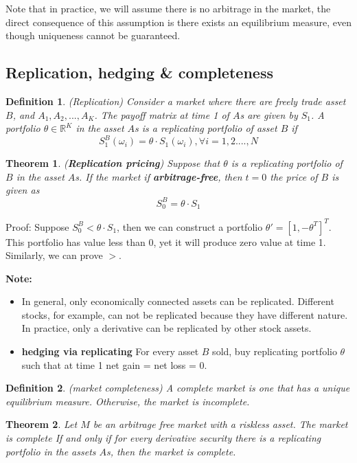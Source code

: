 \documentclass[a4paper,13pt]{report}
\newcommand{\R}{\mathbb{R}}
\newtheorem{theorem}{Theorem}[section]
\newtheorem*{definition}{Definition}
\begin{document}
Note that in practice, we will assume there is no arbitrage in the market, the direct consequence of this assumption is there exists an equilibrium measure, even though uniqueness cannot be guaranteed. 

\subsection{Replication, hedging \& completeness}

\begin{definition}
(Replication) Consider a market where there are freely trade asset $B$, and $A_1,A_2,...,A_K$. The payoff matrix at time 1 of $A$s are given by $S_1$. A portfolio $\theta \in \R^K$ in the asset $A$s is a replicating portfolio of asset $B$ if
$$S_1^B(\omega_i) = \theta \cdot S_1(\omega_i),\forall i=1,2....,N$$
\end{definition}

\begin{theorem}
(\textbf{Replication pricing}) Suppose that $\theta$ is a replicating portfolio of $B$ in the asset $A$s. If the market if \textbf{arbitrage-free}, then $t=0$ the price of $B$ is given as
$$S_0^B = \theta \cdot S_1$$
\end{theorem}
Proof: Suppose $S_0^B < \theta \cdot S_1$, then we can construct a portfolio $\theta' = [1, -\theta^T]^T$. This portfolio has value less than 0, yet it will produce zero value at time 1. Similarly, we can prove $>$.


\textbf{Note:}
\begin{itemize}
    \item In general, only economically connected assets can be replicated. Different stocks, for example, can not be replicated because they have different nature. 
In practice, only a derivative can be replicated by other stock assets.
\item \textbf{hedging via replicating} For every asset $B$ sold, buy replicating portfolio $\theta$ such that at time 1 net gain = net loss = 0. 
\end{itemize}

\begin{definition}
(market completeness) A complete market is one that has a unique equilibrium measure. Otherwise, the market is incomplete.
\end{definition}

\begin{theorem}
Let $M$ be an arbitrage free market with a riskless asset. The market is complete If and only if for every derivative security there is a replicating portfolio in the assets $A$s, then the market is complete.
\end{theorem}
\end{document}
